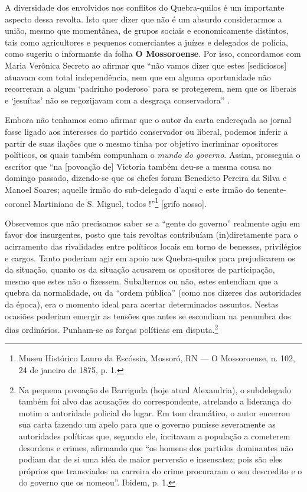 \begin{refsection}
A diversidade dos envolvidos nos conflitos do Quebra-quilos é um importante aspecto dessa revolta. Isto quer dizer que não é um absurdo considerarmos a união, mesmo que momentânea, de grupos sociais e economicamente distintos, tais como agricultores e pequenos comerciantes a juízes e delegados de polícia, como sugeriu o informante da folha \textbf{O Mossoroense}. Por isso, concordamos com Maria Verônica Secreto ao afirmar que “não vamos dizer que estes [sediciosos] atuavam com total independência, nem que em alguma oportunidade não recorreram a algum ‘padrinho poderoso’ para se protegerem, nem que os liberais e ‘jesuítas’ não se regozijavam com a desgraça conservadora” \cite[p.~115]{secreto2011medidos}.

Embora não tenhamos como afirmar que o autor da carta endereçada ao jornal fosse ligado aos interesses do partido conservador ou liberal, podemos inferir a partir de suas ilações que o mesmo tinha por objetivo incriminar opositores políticos, os quais também compunham o \textit{mundo do governo}. Assim, prosseguia o escritor que “na [povoação de] Victoria também deu-se a mesma cousa no domingo passado, dizendo-se que os chefes foram Benedicto Pereira da Silva e Manoel Soares; aquelle irmão do sub-delegado d’aqui e este irmão do tenente-coronel Martiniano de S. Miguel, todos !”\footnote{Museu Histórico Lauro da Escóssia, Mossoró, RN --- O Mossoroense, n. 102, 24 de janeiro de 1875, p. 1.} [grifo nosso].

Observemos que não precisamos saber se a “gente do governo” realmente agiu em favor dos insurgentes, posto que tais revoltas contribuíam (in)diretamente para o acirramento das rivalidades entre políticos locais em torno de benesses, privilégios e cargos. Tanto poderiam agir em apoio aos Quebra-quilos para prejudicarem os da situação, quanto os da situação acusarem os opositores de participação, mesmo que estes não o fizessem. Subalternos ou não, estes entendiam que a quebra da normalidade, ou da “ordem pública” (como nos dizeres das autoridades da época), era o momento ideal para acertar determinados assuntos. Nestas ocasiões poderiam emergir as tensões que antes se escondiam na penumbra dos dias ordinários. Punham-se as forças políticas em disputa.\footnote{Na pequena povoação de Barriguda (hoje atual Alexandria), o subdelegado também foi alvo das acusações do correspondente, atrelando a liderança do motim a autoridade policial do lugar. Em tom dramático, o autor encerrou sua carta fazendo um apelo para que o governo punisse severamente as autoridades políticas que, segundo ele, incitavam a população a cometerem desordens e crimes, afirmando que “os homens dos partidos dominantes não podiam dar de si uma idéa de maior perversão e insensatez; pois são eles próprios que transviados na carreira do crime procuraram o seu descredito e o do governo que os nomeou”. Ibidem, p. 1.}


\end{refsection}
